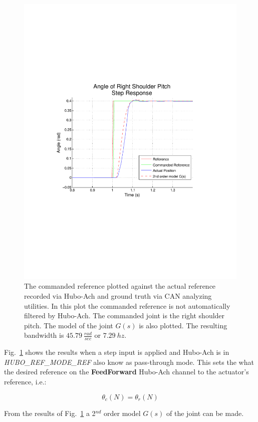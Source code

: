 \begin{figure}[thpb]
  \centering
\includegraphics[width=0.8\columnwidth]{./throwGraph/RSP-Zp4-step-step-real2.pdf}
  \caption{The commanded reference plotted against the actual reference recorded via Hubo-Ach and ground truth via CAN analyzing utilities.  In this plot the commanded reference is not automatically filtered by Hubo-Ach.  The commanded joint is the right shoulder pitch.  The model of the joint $G(s)$ is also plotted.  The resulting bandwidth is $45.79~\frac{rad}{sec}$ or $7.29~hz$.}
  \label{fig:singleJointStep}
\end{figure}






Fig.~\ref{fig:singleJointStep} shows the results when a step input is applied and Hubo-Ach is in \textit{HUBO\_REF\_MODE\_REF} also know as pass-through mode.
This sets the what the desired reference on the \textbf{FeedForward} Hubo-Ach channel to the actuator's reference, i.e.:

\begin{equation}\label{eq:refrefmode}
 \theta_c(N) = \theta_r(N)
\end{equation}

From the results of Fig.~\ref{fig:singleJointStep} a 2$^{nd}$ order model $G(s)$ of the joint can be made.

